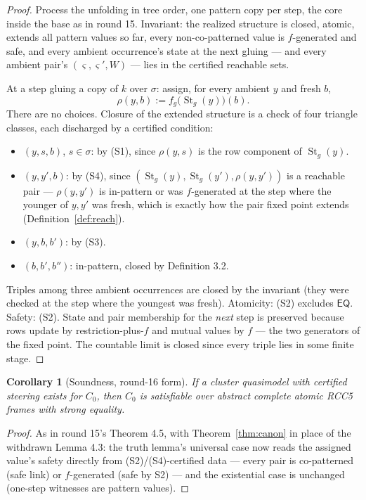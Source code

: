 \documentclass[11pt]{article}
\newtheorem{corollary}[theorem]{Corollary}
\theoremstyle{definition}
\newcommand{\EQ}{\mathsf{EQ}}
\newcommand{\St}{\operatorname{St}}
\begin{document}
\begin{proof}
Process the unfolding in tree order, one pattern copy per step, the
core inside the base as in round 15.  Invariant: the realized structure
is closed, atomic, extends all pattern values so far, every
non-co-patterned value is $f$-generated and safe, and every ambient
occurrence's state at the next gluing --- and every ambient pair's
$(\varsigma,\varsigma',W)$ --- lies in the certified reachable sets.

At a step gluing a copy of $k$ over $\sigma$: assign, for every ambient
$y$ and fresh $b$,
\[
\rho(y,b):=f_g\bigl(\St_g(y)\bigr)(b).
\]
There are no choices.  Closure of the extended structure is a check of
four triangle classes, each discharged by a certified condition:
\begin{itemize}[leftmargin=2em]
\item $(y,s,b)$, $s\in\sigma$: by (S1), since $\rho(y,s)$ is the row
component of $\St_g(y)$.
\item $(y,y',b)$: by (S4), since $(\St_g(y),\St_g(y'),\rho(y,y'))$ is a
reachable pair --- $\rho(y,y')$ is in-pattern or was $f$-generated at
the step where the younger of $y,y'$ was fresh, which is exactly how
the pair fixed point extends (Definition~\ref{def:reach}).
\item $(y,b,b')$: by (S3).
\item $(b,b',b'')$: in-pattern, closed by Definition 3.2.
\end{itemize}
Triples among three ambient occurrences are closed by the invariant
(they were checked at the step where the youngest was fresh).
Atomicity: (S2) excludes $\EQ$.  Safety: (S2).  State and pair
membership for the \emph{next} step is preserved because rows update by
restriction-plus-$f$ and mutual values by $f$ --- the two generators of
the fixed point.  The countable limit is closed since every triple lies
in some finite stage.
\end{proof}

\begin{corollary}[Soundness, round-16 form]\label{cor:sound}
If a cluster quasimodel with certified steering exists for $C_0$, then
$C_0$ is satisfiable over abstract complete atomic RCC5 frames with
strong equality.
\end{corollary}

\begin{proof}
As in round 15's Theorem 4.5, with Theorem~\ref{thm:canon} in place of
the withdrawn Lemma 4.3: the truth lemma's universal case now reads the
assigned value's safety directly from (S2)/(S4)-certified data ---
every pair is co-patterned (safe link) or $f$-generated (safe by S2)
--- and the existential case is unchanged (one-step witnesses are
pattern values).
\end{proof}
\end{document}
